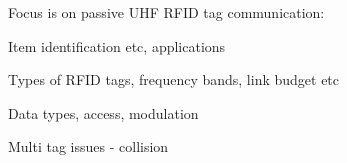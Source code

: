 Focus is on passive UHF RFID tag communication:
\begin{pitemize}
	\item Item identification etc, applications
	\item Types of RFID tags, frequency bands, link budget etc
	\item Data types, access, modulation
	\item Multi tag issues - collision
\end{pitemize}
